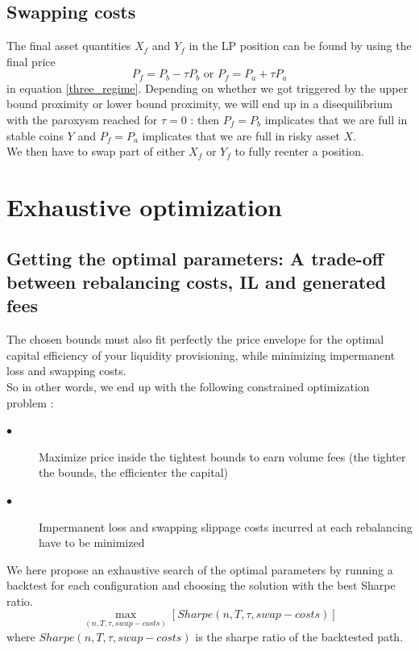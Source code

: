 \documentclass[conference]{IEEEtran}
\begin{document}
\subsection{Swapping costs}
The final asset quantities $X_f$ and $Y_f$ in the LP position can be found by using the final price $$P_f = P_b-\tau P_b \text{ or } P_f = P_a+\tau P_a $$ in equation \ref{three_regime}. Depending on whether we got triggered by the upper bound proximity or lower bound proximity, we will end up in a disequilibrium with the paroxysm reached for $\tau =0$ : then $P_f = P_b$ implicates that we are full in stable coins $Y$ and $P_f = P_a$ implicates that we are full in risky asset $X$.\\
We then have to swap part of either $X_f$ or $Y_f$ to fully reenter a position.\\

\section{Exhaustive optimization}
\subsection{Getting the optimal parameters: A trade-off between rebalancing costs, IL and generated fees}
The chosen bounds must also fit perfectly the price envelope for the optimal capital efficiency of your liquidity provisioning, while minimizing impermanent loss and swapping costs.\\
So in other words, we end up with the following constrained optimization problem :
\\
\begin{description}
  \item[$\bullet$]Maximize price inside the tightest bounds to earn volume fees (the tighter the bounds, the efficienter the capital)
  \item[$\bullet$] Impermanent loss and swapping slippage costs incurred at each rebalancing have to be minimized
\end{description}
We here propose an exhaustive search of the optimal parameters by running a backtest for each configuration and choosing the solution with the best Sharpe ratio.\\
\begin{equation}
\max_{(n, T, \tau, swap-costs)} \left[ Sharpe\left(n, T, \tau, swap-costs\right)\right]
\end{equation}
where $Sharpe\left(n, T, \tau, swap-costs\right)$ is the sharpe ratio of the backtested path.
\end{document}
